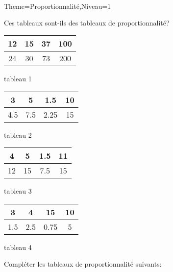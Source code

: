 \documentclass[a4paper,12pt]{article}
\begin{document}
\begin{Maquette}[Fiche]{Theme=Proportionnalité,Niveau=1}

\begin{exercice}
Ces tableaux sont-ils des tableaux de proportionnalité?

\begin{minipage}{0.24\linewidth}
\begin{tabular}{|c|c|c|c|}
\hline 
12 & 15 & 37 & 100 \\ 
\hline 
24 & 30 & 73 & 200 \\ 
\hline 
\end{tabular} 
\begin{center}
 tableau 1 
\end{center}
\end{minipage}\hfill%
\begin{minipage}{0.24\linewidth}
\begin{tabular}{|c|c|c|c|}
\hline 
3 & 5 & 1.5 & 10 \\ 
\hline 
4.5 & 7.5 & 2.25 & 15 \\ 
\hline 
\end{tabular}
\begin{center}
 tableau 2 
\end{center}
\end{minipage}\hfill%
\begin{minipage}{0.24\linewidth}
\begin{tabular}{|c|c|c|c|}
\hline 
4 & 5 & 1.5 & 11 \\ 
\hline 
12 & 15 & 7.5 & 15 \\ 
\hline 
\end{tabular} 
\begin{center}
 tableau 3 
\end{center}
\end{minipage}\hfill%
\begin{minipage}{0.24\linewidth}
\begin{tabular}{|c|c|c|c|}
\hline 
3 & 4 & 15 & 10 \\ 
\hline 
1.5 & 2.5 & 0.75 & 5 \\ 
\hline 
\end{tabular}
\begin{center}
 tableau 4 
\end{center}
\end{minipage}
\end{exercice}

\begin{exercice}
Compléter les tableaux de proportionnalité suivants:


\end{exercice}
\end{Maquette}
\end{document}
